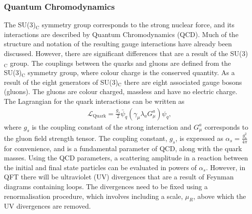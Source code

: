 \subsubsection{Quantum Chromodynamics}
The SU(3)$_\mathrm{C}$ symmetry group corresponds to the strong nuclear force, and its interactions are described by Quantum Chromodynamics (QCD). Much of the structure and notation of the resulting gauge interactions have already been discussed. However, there are significant differences that are a result of the SU(3)$_\mathrm{C}$ group. The couplings between the quarks and gluons are defined from the SU(3)$_\mathrm{C}$ symmetry group, where colour charge is the conserved quantity. As a result of the eight generators of SU(3)$_\mathrm{C}$ there are eight associated gauge bosons (gluons). The gluons are colour charged, massless and have no electric charge. The Lagrangian for the quark interactions can be written as
\begin{equation}
    \label{eq:lagrangianQuark}
    \begin{aligned}
        & \mathcal{L}_\mathrm{Quark} = \frac{g_s}{2}\bar{\psi}_q \left(\gamma_\mu \lambda_a G_\mu^a \right)\psi_q ,
     \end{aligned}
\end{equation}
where $g_s$ is the coupling constant of the strong interaction and $G_\mu^a$ corresponds to the gluon field strength tensor. The coupling constant, $g_s$, is expressed as $\alpha_s = \frac{g_s^2}{4\pi}$ for convenience, and is a fundamental parameter of QCD, along with the quark masses. Using the QCD parameters, a scattering amplitude in a reaction between the initial and final state particles can be evaluated in powers of $\alpha_s$. However, in QFT there will be ultraviolet (UV) divergences that are a result of Feynman diagrams containing loops. The divergences need to be fixed using a renormalisation procedure, which involves including a scale, $\mu_R$, above which the UV divergences are removed. 

